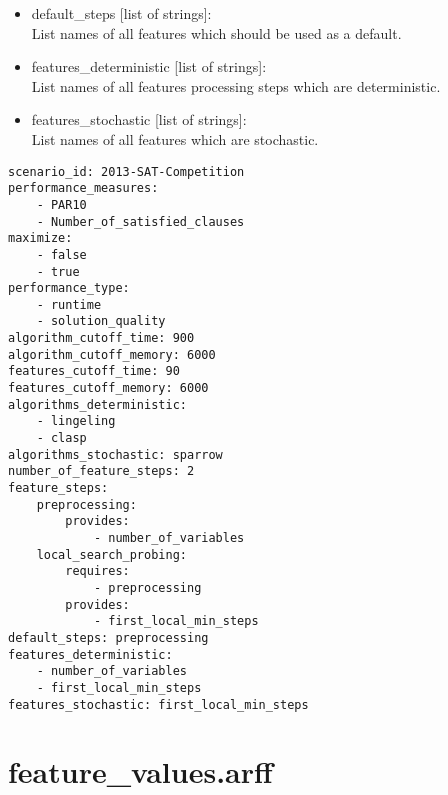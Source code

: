 \begin{itemize}
  	      		$\-\hspace{2cm}$ requires:\\
  	      		$\-\hspace{3cm}$ - name\_1\\
  	      		$\-\hspace{2cm}$ provides:\\
  	      		$\-\hspace{3cm}$ - feature3\\
              	You are free to use any step names you like, 
              	as long as they are unique and do not contain illegal characters.
    \item default\_steps [list of strings]:\\
    	  List names of all features which should be used as a default.
    \item features\_deterministic [list of strings]:\\
    	  List names of all features processing steps which are deterministic.
    \item features\_stochastic [list of strings]:\\
          List names of all features which are stochastic. 
\end{itemize}

\begin{lstlisting}[caption=Example description.txt]
scenario_id: 2013-SAT-Competition
performance_measures:
    - PAR10
    - Number_of_satisfied_clauses
maximize:
    - false
    - true
performance_type: 
    - runtime
    - solution_quality
algorithm_cutoff_time: 900
algorithm_cutoff_memory: 6000
features_cutoff_time: 90
features_cutoff_memory: 6000
algorithms_deterministic:
    - lingeling
    - clasp
algorithms_stochastic: sparrow
number_of_feature_steps: 2
feature_steps:
    preprocessing:
        provides: 
            - number_of_variables
    local_search_probing:
        requires:
            - preprocessing
        provides:
            - first_local_min_steps
default_steps: preprocessing
features_deterministic:
    - number_of_variables
    - first_local_min_steps
features_stochastic: first_local_min_steps
\end{lstlisting}

\section{feature\_values.arff}

